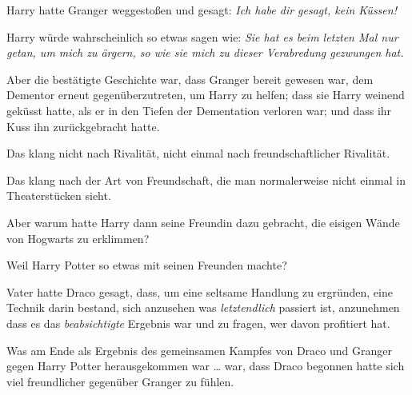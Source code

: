 Harry hatte Granger weggestoßen und gesagt: \emph{Ich habe dir gesagt, kein Küssen!}

Harry würde wahrscheinlich so etwas sagen wie: \emph{Sie hat es beim letzten Mal nur getan, um mich zu ärgern, so wie sie mich zu dieser Verabredung gezwungen hat.}

Aber die bestätigte Geschichte war, dass Granger bereit gewesen war, dem Dementor erneut gegenüberzutreten, um Harry zu helfen; dass sie Harry weinend geküsst hatte, als er in den Tiefen der Dementation verloren war; und dass ihr Kuss ihn zurückgebracht hatte.

Das klang nicht nach Rivalität, nicht einmal nach freundschaftlicher Rivalität.

Das klang nach der Art von Freundschaft, die man normalerweise nicht einmal in Theaterstücken sieht.

Aber warum hatte Harry dann seine Freundin dazu gebracht, die eisigen Wände von Hogwarts zu erklimmen?

Weil Harry Potter so etwas mit seinen Freunden machte?

Vater hatte Draco gesagt, dass, um eine seltsame Handlung zu ergründen, eine Technik darin bestand, sich anzusehen was \emph{letztendlich} passiert ist, anzunehmen dass es das \emph{beabsichtigte} Ergebnis war und zu fragen, wer davon profitiert hat.

Was am Ende als Ergebnis des gemeinsamen Kampfes von Draco und Granger gegen Harry Potter herausgekommen war … war, dass Draco begonnen hatte sich viel freundlicher gegenüber Granger zu fühlen.

